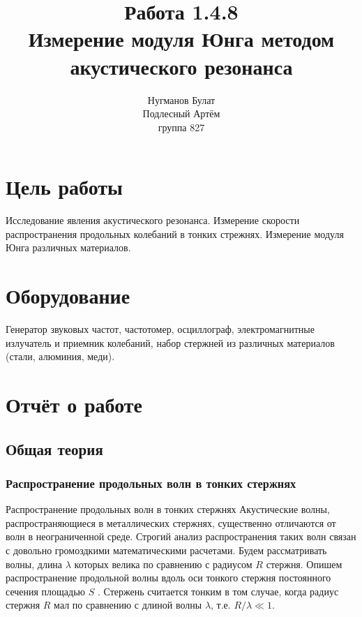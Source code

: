\documentclass[a4paper, 10pt]{article}%
\author{Нугманов Булат \\ Подлесный Артём \\ группа 827}
\title{Работа 1.4.8 \\ Измерение модуля Юнга методом 
акустического резонанса}
\begin{document}
\maketitle
\section*{Цель работы}
Исследование явления акустического резонанса. Измерение скорости
распространения продольных колебаний в тонких стрежнях. Измерение модуля Юнга различных материалов. 
\section*{Оборудование}
Генератор звуковых частот, частотомер, осциллограф,
электромагнитные излучатель и приемник колебаний, набор стержней из различных материалов (стали, алюминия, меди).
\section*{Отчёт о работе}
\subsection*{Общая теория}
\subsubsection*{Распространение продольных волн в тонких стержнях}
Распространение продольных волн в тонких стержнях 
Акустические волны, распространяющиеся в металлических стержнях,
существенно отличаются от волн в неограниченной среде. Строгий анализ
распространения таких волн связан с довольно громоздкими математическими
расчетами. Будем рассматривать волны, длина $\lambda$ которых велика по
сравнению с радиусом $R$ стержня. Опишем распространение продольной
волны вдоль оси тонкого стержня постоянного сечения площадью $S$ .
Стержень считается тонким в том случае, когда радиус стержня $R$ мал по
сравнению с длиной волны $\lambda$, т.е. $R/\lambda\ll 1$.
\end{document}
